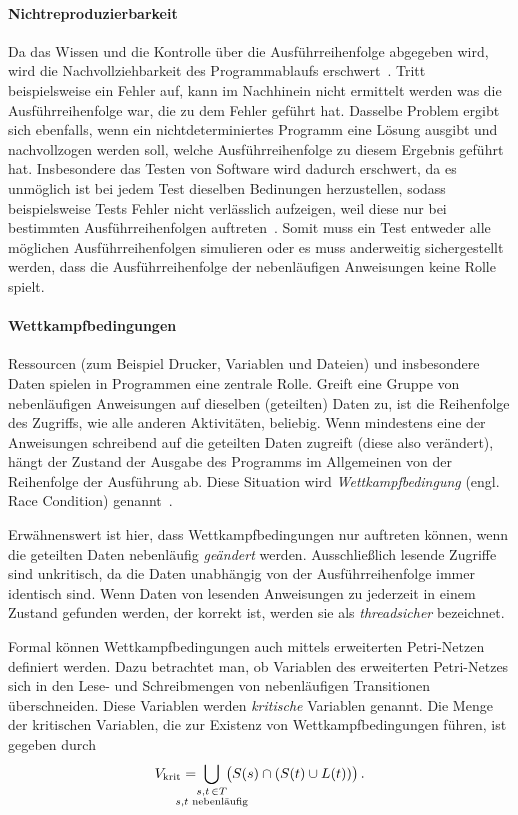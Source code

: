 \paragraph{Nichtreproduzierbarkeit}
Da das Wissen und die Kontrolle über die Ausführreihenfolge abgegeben wird, wird die Nachvollziehbarkeit des Programmablaufs erschwert~\cite[S.~20]{Herrtwich1989}. Tritt beispielsweise ein Fehler auf, kann im Nachhinein nicht ermittelt werden was die Ausführreihenfolge war, die zu dem Fehler geführt hat. Dasselbe Problem ergibt sich ebenfalls, wenn ein nichtdeterminiertes Programm eine Lösung ausgibt und nachvollzogen werden soll, welche Ausführreihenfolge zu diesem Ergebnis geführt hat. Insbesondere das Testen von Software wird dadurch erschwert, da es unmöglich ist bei jedem Test dieselben Bedinungen herzustellen, sodass beispielsweise Tests Fehler nicht verlässlich aufzeigen, weil diese nur bei bestimmten Ausführreihenfolgen auftreten~\cite[S.~20]{Herrtwich1989}. Somit muss ein Test entweder alle möglichen Ausführreihenfolgen simulieren oder es muss anderweitig sichergestellt werden, dass die Ausführreihenfolge der nebenläufigen Anweisungen keine Rolle spielt.
\paragraph{Wettkampfbedingungen}
Ressourcen (zum Beispiel Drucker, Variablen und Dateien) und insbesondere Daten spielen in Programmen eine zentrale Rolle. Greift eine Gruppe von nebenläufigen Anweisungen auf dieselben (geteilten) Daten zu, ist die Reihenfolge des Zugriffs, wie alle anderen Aktivitäten, beliebig. Wenn mindestens eine der Anweisungen schreibend auf die geteilten Daten zugreift (diese also verändert), hängt der Zustand der Ausgabe des Programms im Allgemeinen von der Reihenfolge der Ausführung ab. Diese Situation wird \emph{Wettkampfbedingung} (engl. Race Condition) genannt~\cite{Hettel2016}. 

Erwähnenswert ist hier, dass Wettkampfbedingungen nur auftreten können, wenn die geteilten Daten nebenläufig \emph{geändert} werden. Ausschließlich lesende Zugriffe sind unkritisch, da die Daten unabhängig von der Ausführreihenfolge immer identisch sind. Wenn Daten von lesenden Anweisungen zu jederzeit in einem Zustand gefunden werden, der korrekt ist, werden sie als \emph{threadsicher} bezeichnet.

Formal können Wettkampfbedingungen auch mittels erweiterten Petri-Netzen definiert werden. Dazu betrachtet man, ob Variablen des erweiterten Petri-Netzes sich in den Lese- und Schreibmengen von nebenläufigen Transitionen überschneiden. Diese Variablen werden \emph{kritische} Variablen genannt. Die Menge der kritischen Variablen, die zur Existenz von Wettkampfbedingungen führen, ist gegeben durch
\begin{align*}
	V_\text{krit} = \;\bigcup_{\mathclap{\substack{s,t\, \in T\\s, t \text{ nebenläufig}}}} \;\left( \strut{S(s) \cap (S(t) \cup L(t))}\right).
\end{align*}

